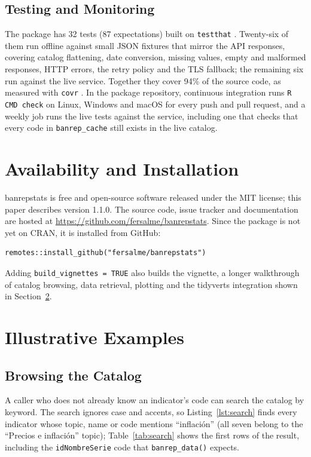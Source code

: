 \documentclass[conference]{IEEEtran}
\begin{document}
\subsection{Testing and Monitoring}
The package has 32 tests (87 expectations) built on \texttt{testthat}
\cite{b_testthat}. Twenty-six of them run offline against small JSON
fixtures that mirror the API responses, covering catalog flattening,
date conversion, missing values, empty and malformed responses, HTTP
errors, the retry policy and the TLS fallback; the remaining six run
against the live service. Together they cover 94\% of the source code,
as measured with \texttt{covr} \cite{b_covr}. In the package repository,
continuous integration runs \texttt{R CMD check} on Linux, Windows and
macOS for every push and pull request, and a weekly job runs the live
tests against the service, including one that checks that every code
in \texttt{banrep\_cache} still exists in the live catalog.

\section{Availability and Installation}

banrepstats is free and open-source software released under the MIT
license; this paper describes version 1.1.0. The source code, issue
tracker and documentation are hosted at
\url{https://github.com/fersalme/banrepstats}. Since the package is not
yet on CRAN, it is installed from GitHub:

\begin{lstlisting}
remotes::install_github("fersalme/banrepstats")
\end{lstlisting}

\noindent Adding \texttt{build\_vignettes = TRUE} also builds the
vignette, a longer walkthrough of catalog browsing, data retrieval,
plotting and the tidyverts integration shown in
Section~\ref{sec:examples}.

\section{Illustrative Examples}
\label{sec:examples}

\subsection{Browsing the Catalog}
A caller who does not already know an indicator's code can search the
catalog by keyword. The search ignores case and accents, so
Listing~\ref{lst:search} finds every indicator whose topic, name or code
mentions ``inflaci\'on'' (all seven belong to the ``Precios e
inflaci\'on'' topic); Table~\ref{tab:search} shows the first rows of the
result, including the \texttt{idNombreSerie} code that
\texttt{banrep\_data()} expects.
\end{document}
